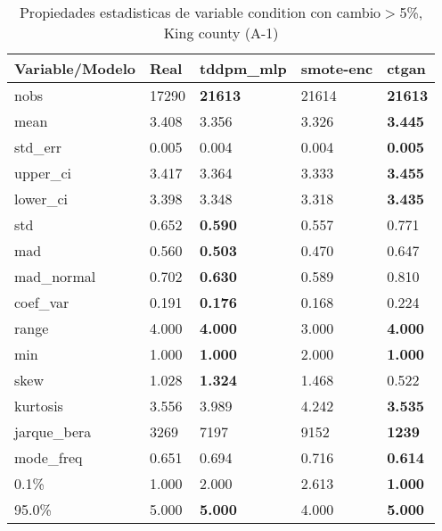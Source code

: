 \begin{table}[H]
\centering
\fontsize{8}{14}\selectfont
\caption{Propiedades estadisticas de variable condition con cambio\ensuremath{>}5\%, King county (A-1)}
\label{table-stats-king county-a-1-condition-short}
\begin{tabular}{|l|m{10em}|m{10em}|m{10em}|m{10em}|}
\hline
 \rowcolor[gray]{0.8}
Variable/Modelo & Real & tddpm\_mlp & smote-enc & ctgan \\
\hline nobs & 17290 & \bfseries 21613 & \cellcolor[rgb]{0.9, 0.54, 0.52} 21614 & \bfseries 21613 \\
\hline mean & 3.408 & 3.356 & \cellcolor[rgb]{0.9, 0.54, 0.52} 3.326 & \bfseries 3.445 \\
\hline std\_err & 0.005 & 0.004 & \cellcolor[rgb]{0.9, 0.54, 0.52} 0.004 & \bfseries 0.005 \\
\hline upper\_ci & 3.417 & 3.364 & \cellcolor[rgb]{0.9, 0.54, 0.52} 3.333 & \bfseries 3.455 \\
\hline lower\_ci & 3.398 & 3.348 & \cellcolor[rgb]{0.9, 0.54, 0.52} 3.318 & \bfseries 3.435 \\
\hline std & 0.652 & \bfseries 0.590 & 0.557 & \cellcolor[rgb]{0.9, 0.54, 0.52} 0.771 \\
\hline mad & 0.560 & \bfseries 0.503 & \cellcolor[rgb]{0.9, 0.54, 0.52} 0.470 & 0.647 \\
\hline mad\_normal & 0.702 & \bfseries 0.630 & \cellcolor[rgb]{0.9, 0.54, 0.52} 0.589 & 0.810 \\
\hline coef\_var & 0.191 & \bfseries 0.176 & 0.168 & \cellcolor[rgb]{0.9, 0.54, 0.52} 0.224 \\
\hline range & 4.000 & \bfseries 4.000 & \cellcolor[rgb]{0.9, 0.54, 0.52} 3.000 & \bfseries 4.000 \\
\hline min & 1.000 & \bfseries 1.000 & \cellcolor[rgb]{0.9, 0.54, 0.52} 2.000 & \bfseries 1.000 \\
\hline skew & 1.028 & \bfseries 1.324 & 1.468 & \cellcolor[rgb]{0.9, 0.54, 0.52} 0.522 \\
\hline kurtosis & 3.556 & 3.989 & \cellcolor[rgb]{0.9, 0.54, 0.52} 4.242 & \bfseries 3.535 \\
\hline jarque\_bera & 3269 & 7197 & \cellcolor[rgb]{0.9, 0.54, 0.52} 9152 & \bfseries 1239 \\
\hline mode\_freq & 0.651 & 0.694 & \cellcolor[rgb]{0.9, 0.54, 0.52} 0.716 & \bfseries 0.614 \\
\hline 0.1\% & 1.000 & 2.000 & \cellcolor[rgb]{0.9, 0.54, 0.52} 2.613 & \bfseries 1.000 \\
\hline 95.0\% & 5.000 & \bfseries 5.000 & \cellcolor[rgb]{0.9, 0.54, 0.52} 4.000 & \bfseries 5.000 \\
\hline
\end{tabular}
\end{table}
